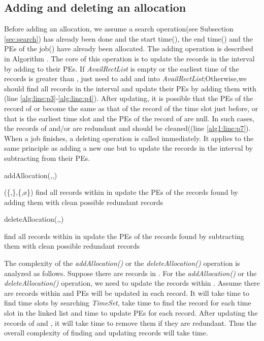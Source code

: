 \documentclass[preprint,12pt]{elsarticle}
\begin{document}
\subsection{Adding and deleting an allocation}

Before adding an allocation, we assume a search operation(see Subsection \ref{sec:search}) has already been done and the start time(), the end time() and the PEs of the job() have already been allocated. The adding operation is described in Algorithm . The core of this operation is to update the records in the interval  by adding  to their PEs. If \emph{AvailRectList} is empty or the earliest time of the records is greater than , just need to add  and  into \emph{AvailRectList};Otherwise,we should find all records in the interval  and update their PEs by adding them with (line \ref{alg:line:p3}-\ref{alg:line:p4}). After updating, it is possible that the PEs of the record of  or  become the same as that of the record of the time slot just before, or that  is the earliest time slot and the PEs of the record of  are null. In such cases, the records of  and/or  are redundant and should be cleaned((line \ref{alg1:line:p7}). When a job finishes, a deleting operation  is called immediately. It applies to the same principle as adding a new one but to update the records in the interval  by subtracting  from their PEs.


\begin{algorithm}[htbp]
\caption{addAllocation(,,)}
\label{alg:add}

    {
        (\{,\},\{,\o\})\;
        \label{alg:line:p1}
    }
    {
        find all records within  in \;\label{alg:line:p3}
        update the PEs of the records found by adding them with \;\label{alg:line:p4}
    \label{alg1:line:p6}
    }
clean possible redundant records\;
\label{alg1:line:p7}
\end{algorithm}




\begin{algorithm}[htbp]
\caption{deleteAllocation(,,)}
\label{alg:delete}
find all records within  in \;
update the PEs of the records found by subtracting them with \;
clean possible redundant records\;
\end{algorithm}

The complexity of the \emph{addAllocation()} or the \emph{deleteAllocation()} operation is analyzed as follows. Suppose there are  records in . For the \emph{addAllocation()} or the \emph{deleteAllocation()} operation, we need to update the records within . Assume there are  records within
 and  PEs will be updated in each record. It will take  time to find  time slots by searching \emph{TimeSet}, take  time to find the record for each time slot in the linked list and  time to update  PEs for each record. After updating the records of  and , it will take  time to remove them if they are redundant. Thus the overall complexity of finding and updating  records will take  time.
\end{document}
